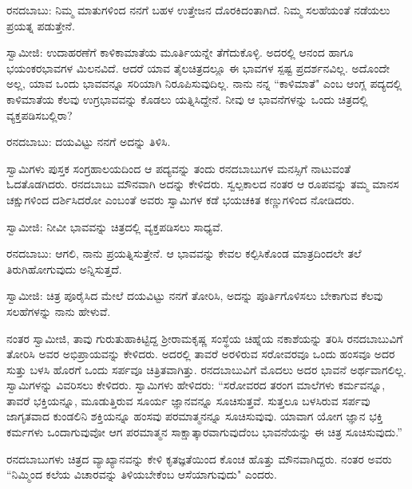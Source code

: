 ರನದಬಾಬು: ನಿಮ್ಮ ಮಾತುಗಳಿಂದ ನನಗೆ ಬಹಳ ಉತ್ತೇಜನ ದೊರಕಿದಂತಾಗಿದೆ. ನಿಮ್ಮ ಸಲಹೆಯಂತೆ ನಡೆಯಲು ಪ್ರಯತ್ನ ಪಡುತ್ತೇನೆ.

ಸ್ವಾಮೀಜಿ: ಉದಾಹರಣೆಗೆ ಕಾಳಿಕಾಮಾತೆಯ ಮೂರ್ತಿಯನ್ನೇ ತೆಗೆದುಕೊಳ್ಳಿ. ಅದರಲ್ಲಿ ಆನಂದ ಹಾಗೂ ಭಯಂಕರಭಾವಗಳ ಮಿಲನವಿದೆ. ಆದರೆ ಯಾವ ತೈಲಚಿತ್ರದಲ್ಲೂ ಈ ಭಾವಗಳ ಸ್ಪಷ್ಟ ಪ್ರದರ್ಶನವಿಲ್ಲ. ಅದೊಂದೇ ಅಲ್ಲ, ಯಾವ ಒಂದು ಭಾವವನ್ನೂ ಸರಿಯಾಗಿ ನಿರೂಪಿಸುವುದಿಲ್ಲ. ನಾನು ನನ್ನ “ಕಾಳಿಮಾತೆ" ಎಂಬ ಆಂಗ್ಲ ಪದ್ಯದಲ್ಲಿ ಕಾಳಿಮಾತೆಯ ಕೆಲವು ಉಗ್ರಭಾವವನ್ನು ಕೊಡಲು ಯತ್ನಿಸಿದ್ದೇನೆ. ನೀವು ಆ ಭಾವನೆಗಳನ್ನು ಒಂದು ಚಿತ್ರದಲ್ಲಿ ವ್ಯಕ್ತಪಡಿಸಬಲ್ಲಿರಾ?

ರನದಬಾಬು: ದಯವಿಟ್ಟು ನನಗೆ ಅದನ್ನು ತಿಳಿಸಿ.

ಸ್ವಾಮಿಗಳು ಪುಸ್ತಕ ಸಂಗ್ರಹಾಲಯದಿಂದ ಆ ಪದ್ಯವನ್ನು ತಂದು ರನದಬಾಬುಗಳ ಮನಸ್ಸಿಗೆ ನಾಟುವಂತೆ ಓದತೊಡಗಿದರು. ರನದಬಾಬು ಮೌನವಾಗಿ ಅದನ್ನು ಕೇಳಿದರು. ಸ್ವಲ್ಪಕಾಲದ ನಂತರ ಆ ರೂಪವನ್ನು ತಮ್ಮ ಮಾನಸ ಚಕ್ಷುಗಳಿಂದ ದರ್ಶಿಸಿದರೋ ಎಂಬಂತೆ ಅವರು ಸ್ವಾಮಿಗಳ ಕಡೆ ಭಯಚಕಿತ ಕಣ್ಣುಗಳಿಂದ ನೋಡಿದರು.

ಸ್ವಾಮೀಜಿ: ನೀವೀ ಭಾವವನ್ನು ಚಿತ್ರದಲ್ಲಿ ವ್ಯಕ್ತಪಡಿಸಲು ಸಾಧ್ಯವೆ.

ರನದಬಾಬು: ಆಗಲಿ, ನಾನು ಪ್ರಯತ್ನಿಸುತ್ತೇನೆ. ಆ ಭಾವವನ್ನು ಕೇವಲ ಕಲ್ಪಿಸಿಕೊಂಡ ಮಾತ್ರದಿಂದಲೇ ತಲೆ ತಿರುಗಿಹೋಗುವುದು ಅನ್ನಿಸುತ್ತದೆ.

ಸ್ವಾಮೀಜಿ: ಚಿತ್ರ ಪೂರೈಸಿದ ಮೇಲೆ ದಯವಿಟ್ಟು ನನಗೆ ತೋರಿಸಿ, ಅದನ್ನು ಪೂರ್ತಿಗೊಳಿಸಲು ಬೇಕಾಗುವ ಕೆಲವು ಸಲಹೆಗಳನ್ನು ನಾನು ಹೇಳುವೆ.

ನಂತರ ಸ್ವಾಮೀಜಿ, ತಾವು ಗುರುತುಹಾಕಿಟ್ಟಿದ್ದ ಶ‍್ರೀರಾಮಕೃಷ್ಣ ಸಂಸ್ಥೆಯ ಚಿಹ್ನೆಯ ನಕಾಶೆಯನ್ನು ತರಿಸಿ ರನದಬಾಬುವಿಗೆ ತೋರಿಸಿ ಅವರ ಅಭಿಪ್ರಾಯವನ್ನು ಕೇಳಿದರು. ಅದರಲ್ಲಿ ತಾವರೆ ಅರಳಿರುವ ಸರೋವರವೂ ಒಂದು ಹಂಸವೂ ಅದರ ಸುತ್ತು ಬಳಸಿ ಹೊರಗೆ ಒಂದು ಸರ್ಪವೂ ಚಿತ್ರಿತವಾಗಿತ್ತು. ರನದಬಾಬುವಿಗೆ ಮೊದಲು ಅದರ ಭಾವನೆ ಅರ್ಥವಾಗಲಿಲ್ಲ. ಸ್ವಾಮಿಗಳನ್ನು ವಿವರಿಸಲು ಕೇಳಿದರು. ಸ್ವಾಮಿಗಳು ಹೇಳಿದರು: “ಸರೋವರದ ತರಂಗ ಮಾಲೆಗಳು ಕರ್ಮವನ್ನೂ, ತಾವರೆ ಭಕ್ತಿಯನ್ನೂ, ಮೂಡುತ್ತಿರುವ ಸೂರ್ಯ ಜ್ಞಾನವನ್ನೂ ಸೂಚಿಸುತ್ತವೆ. ಸುತ್ತಲೂ ಬಳಸಿರುವ ಸರ್ಪವು ಜಾಗೃತವಾದ ಕುಂಡಲಿನಿ ಶಕ್ತಿಯನ್ನೂ ಹಂಸವು ಪರಮಾತ್ಮನನ್ನೂ ಸೂಚಿಸುವುವು. ಯಾವಾಗ ಯೋಗ ಜ್ಞಾನ ಭಕ್ತಿ ಕರ್ಮಗಳು ಒಂದಾಗುವುವೋ ಆಗ ಪರಮಾತ್ಮನ ಸಾಕ್ಷಾತ್ಕಾರವಾಗುವುದೆಂಬ ಭಾವನೆಯನ್ನು ಈ ಚಿತ್ರ ಸೂಚಿಸುವುದು.”

ರನದಬಾಬುಗಳು ಚಿತ್ರದ ವ್ಯಾಖ್ಯಾನವನ್ನು ಕೇಳಿ ಕೃತಜ್ಞತೆಯಿಂದ ಕೊಂಚ ಹೊತ್ತು ಮೌನವಾಗಿದ್ದರು. ನಂತರ ಅವರು “ನಿಮ್ಮಿಂದ ಕಲೆಯ ವಿಚಾರವನ್ನು ತಿಳಿಯಬೇಕೆಂಬ ಆಸೆಯಾಗುವುದು" ಎಂದರು.

